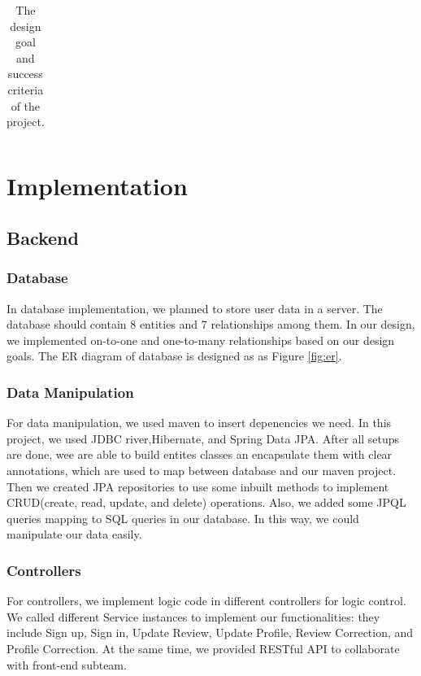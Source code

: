\documentclass[12pt]{article}
\begin{document}
\begin{table}[!htbp]
{\begin{tabular}{|l|l|l|}
    \end{tabular}%
    }
    \caption{The design goal and success criteria of the project.}
    \end{table}


\section{Implementation}
\subsection{Backend}

\subsubsection {Database}
In database implementation, we planned to store user data in a server. The database should contain 8 entities and 7 relationships among them. In our design, we implemented on-to-one and one-to-many relationships based on our design goals. 
The ER diagram of database is designed as as Figure \ref{fig:er}.

\subsubsection {Data Manipulation}
For data manipulation, we used maven to insert depenencies we need. In this project, we used JDBC river,Hibernate, and Spring Data JPA. After all setups are done, wee are able to build entites classes an encapsulate them with clear annotations, which are used to map between database and our maven project. Then we created JPA repositories to use some inbuilt methods to implement CRUD(create, read, update, and delete) operations. Also, we added some JPQL queries mapping to SQL queries in our database. In this way, we could manipulate our data easily.

\subsubsection {Controllers}
For controllers, we implement logic code in different controllers for logic control. We called different Service instances to implement our functionalities: they include Sign up, Sign in, Update Review, Update Profile, Review Correction, and Profile Correction. At the same time, we provided RESTful API to collaborate with front-end subteam.
\end{document}
